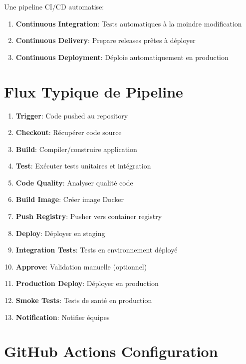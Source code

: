 \documentclass[12pt,a4paper]{report}
\begin{document}
Une pipeline CI/CD automatise:
\begin{enumerate}
    \item \textbf{Continuous Integration}: Tests automatiques à la moindre modification
    \item \textbf{Continuous Delivery}: Prepare releases prêtes à déployer
    \item \textbf{Continuous Deployment}: Déploie automatiquement en production
\end{enumerate}

\section{Flux Typique de Pipeline}

\begin{enumerate}
    \item \textbf{Trigger}: Code pushed au repository
    \item \textbf{Checkout}: Récupérer code source
    \item \textbf{Build}: Compiler/construire application
    \item \textbf{Test}: Exécuter tests unitaires et intégration
    \item \textbf{Code Quality}: Analyser qualité code
    \item \textbf{Build Image}: Créer image Docker
    \item \textbf{Push Registry}: Pusher vers container registry
    \item \textbf{Deploy}: Déployer en staging
    \item \textbf{Integration Tests}: Tests en environnement déployé
    \item \textbf{Approve}: Validation manuelle (optionnel)
    \item \textbf{Production Deploy}: Déployer en production
    \item \textbf{Smoke Tests}: Tests de santé en production
    \item \textbf{Notification}: Notifier équipes
\end{enumerate}

\section{GitHub Actions Configuration}
\end{document}
